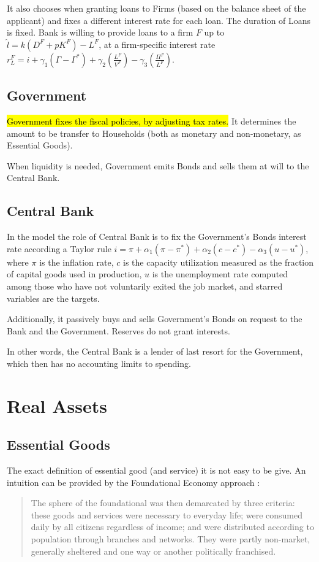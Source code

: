 \documentclass[a4paper, headings=standardclasses]{scrartcl}
\begin{document}
It also chooses when granting loans to Firms (based on the balance sheet of the applicant) and fixes a different interest rate for each loan. The duration of Loans is fixed.
Bank is willing to provide loans to a firm $F$ up to $\hat{l} = k (D^F+pK^F) - L^F$, at a firm-specific interest rate $r_L^F = i + \gamma_1 (\Gamma - \Gamma^*) + \gamma_2 (\frac{L^F}{V^F}) - \gamma_3 (\frac{\Pi^F}{L^F})$.

\subsection{Government}
\hl{Government fixes the fiscal policies, by adjusting tax rates.} It determines the amount to be transfer to Households (both as monetary and non-monetary, as Essential Goods).

When liquidity is needed, Government emits Bonds and sells them at will to the Central Bank.

\subsection{Central Bank}
In the model the role of Central Bank is to fix the Government's Bonds interest rate according a Taylor rule $i = \pi + \alpha_1 (\pi - \pi^*) + \alpha_2 (c - c^*) - \alpha_3 (u - u^*)$, where $\pi$ is the inflation rate, $c$ is the capacity utilization measured as the fraction of capital goods used in production, $u$ is the unemployment rate computed among those who have not voluntarily exited the job market, and starred variables are the targets.

Additionally, it passively buys and sells Government's Bonds on request to the Bank and the Government. Reserves do not grant interests.

In other words, the Central Bank is a lender of last resort for the Government, which then has no accounting limits to spending.

\section{Real Assets}
\subsection{Essential Goods}
The exact definition of essential good (and service) it is not easy to be give. An intuition can be provided by the Foundational Economy approach \parencite{arcidiacono2018}: \begin{quote}
	The sphere of the foundational was then demarcated by three criteria: these goods and services were necessary to everyday life; were consumed daily by all citizens regardless of income; and were distributed according to population through branches and networks. They were partly non-market, generally sheltered and one way or another politically franchised.
\end{quote}
\end{document}
